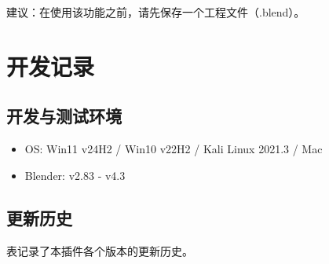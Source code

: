 \documentclass{../../public_resources/doc}
\begin{document}
建议：在使用该功能之前，请先保存一个工程文件（.blend）。

\section{开发记录}
\subsection{开发与测试环境}
\begin{itemize}
    \item OS: Win11 v24H2 / Win10 v22H2 / Kali Linux 2021.3 / Mac
    \item Blender: v2.83 ‑ v4.3
\end{itemize}

\subsection{更新历史}
表记录了本插件各个版本的更新历史。
\end{document}
